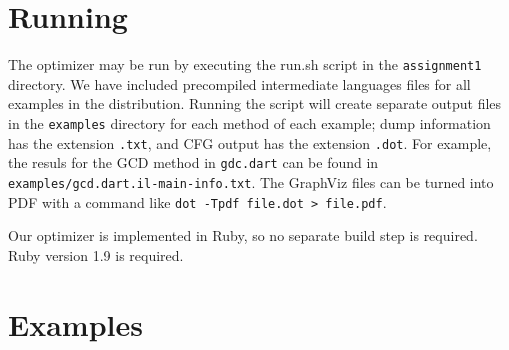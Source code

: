 \documentclass[10pt,twocolumn]{article}
\begin{document}
\section{Running}

The optimizer may be run by executing the run.sh script in the
\texttt{assignment1} directory. We have included precompiled
intermediate languages files for all examples in the
distribution. Running the script will create separate output files in
the \texttt{examples} directory for each method of each example; dump
information has the extension \texttt{.txt}, and CFG output has the
extension \texttt{.dot}. For example, the resuls for the GCD method in
\texttt{gdc.dart} can be found in
\texttt{examples/gcd.dart.il-main-info.txt}. The GraphViz files can
be turned into PDF with a command like \texttt{dot -Tpdf file.dot >
  file.pdf}.

Our optimizer is implemented in Ruby, so no separate build step is
required. Ruby version 1.9 is required.

\section{Examples}
\end{document}
